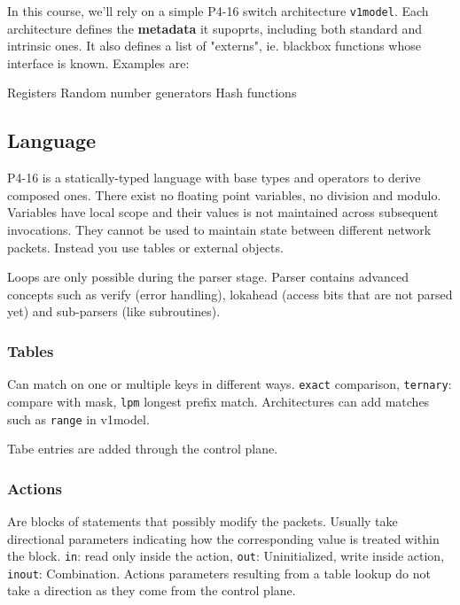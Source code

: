 \documentclass[a4paper, fontsize=8pt, landscape, DIV=1]{scrartcl}
\begin{document}
\begin{multicols*}{4}

  In this course, we'll rely on a simple P4-16 switch architecture \texttt{v1model}.
  Each architecture defines the \textbf{metadata} it supoprts, including both standard and 
  intrinsic ones. It also defines a list of "externs", ie. blackbox functions whose interface
  is known. Examples are:
  \begin{outline}
   \1 Registers
   \1 Random number generators
   \1 Hash functions
  \end{outline}

  \subsection{Language}
  P4-16 is a statically-typed language with base types and operators to derive composed ones.
  There exist no floating point variables, no division and modulo. Variables have local scope and
  their values is not maintained across subsequent invocations. They cannot be used to
  maintain state between different network packets. Instead you use tables or external
  objects.

  Loops are only possible during the parser stage. Parser contains advanced concepts such as
  verify (error handling), lokahead (access bits that are not parsed yet) and sub-parsers
  (like subroutines).

  \subsubsection{Tables}
  Can match on one or multiple keys in different ways. \texttt{exact}
  comparison, \texttt{ternary}: compare with mask, \texttt{lpm} longest prefix match.
  Architectures can add matches such as \texttt{range} in v1model.

  Tabe entries are added through the control plane.
  
  \subsubsection{Actions}
  Are blocks of statements that possibly modify the packets. Usually take directional
  parameters indicating how the corresponding value is treated within the block.
  \texttt{in}: read only inside the action, \texttt{out}: Uninitialized, write inside action,
  \texttt{inout}: Combination. Actions parameters resulting from a table lookup do not 
  take a direction as they come from the control plane.


\end{multicols*}
\end{document}
